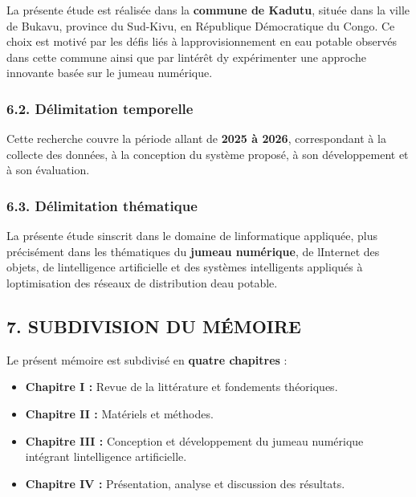 \documentclass[12pt,a4paper,oneside]{report}
\begin{document}
La présente étude est réalisée dans la \textbf{commune de Kadutu},
située dans la ville de Bukavu, province du Sud-Kivu, en République
Démocratique du Congo. Ce choix est motivé par les défis liés à
l\textquotesingle approvisionnement en eau potable observés dans cette
commune ainsi que par l\textquotesingle intérêt d\textquotesingle y
expérimenter une approche innovante basée sur le jumeau numérique.

\subsubsection{6.2. Délimitation
temporelle}\label{duxe9limitation-temporelle}

Cette recherche couvre la période allant de \textbf{2025 à 2026},
correspondant à la collecte des données, à la conception du système
proposé, à son développement et à son évaluation.

\subsubsection{6.3. Délimitation
thématique}\label{duxe9limitation-thuxe9matique}

La présente étude s\textquotesingle inscrit dans le domaine de
l\textquotesingle informatique appliquée, plus précisément dans les
thématiques du \textbf{jumeau numérique}, de l\textquotesingle Internet
des objets, de l\textquotesingle intelligence artificielle et des
systèmes intelligents appliqués à l\textquotesingle optimisation des
réseaux de distribution d\textquotesingle eau potable.

\subsection{7. SUBDIVISION DU MÉMOIRE}\label{subdivision-du-muxe9moire}

Le présent mémoire est subdivisé en \textbf{quatre chapitres} :

\begin{itemize}
\item
  \textbf{Chapitre I :} Revue de la littérature et fondements
  théoriques.
\item
  \textbf{Chapitre II :} Matériels et méthodes.
\item
  \textbf{Chapitre III :} Conception et développement du jumeau
  numérique intégrant l\textquotesingle intelligence artificielle.
\item
  \textbf{Chapitre IV :} Présentation, analyse et discussion des
  résultats.
\end{itemize}
\end{document}
